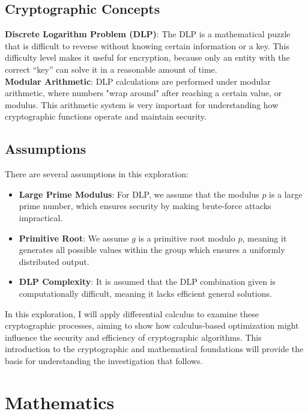\documentclass[12pt]{article}
\begin{document}
\subsection{Cryptographic Concepts}

\textbf{Discrete Logarithm Problem (DLP)}: The DLP is a mathematical puzzle that is difficult to reverse without knowing certain information or a key. This difficulty level makes it useful for encryption, because only an entity with the correct “key” can solve it in a reasonable amount of time.
\\
\textbf{Modular Arithmetic}: DLP calculations are performed under modular arithmetic, where numbers "wrap around" after reaching a certain value, or modulus. This arithmetic system is very important for understanding how cryptographic functions operate and maintain security.

\subsection{Assumptions}

There are several assumptions in this exploration:
\begin{itemize}
    \item \textbf{Large Prime Modulus}: For DLP, we assume that the modulus \( p \) is a large prime number, which ensures security by making brute-force attacks impractical.
    \item \textbf{Primitive Root}: We assume \( g \) is a primitive root modulo \( p \), meaning it generates all possible values within the group which ensures a uniformly distributed output.
    \item \textbf{DLP Complexity}: It is assumed that the DLP combination given is computationally difficult, meaning it lacks efficient general solutions.
\end{itemize}

In this exploration, I will apply differential calculus to examine these cryptographic processes, aiming to show how calculus-based optimization might influence the security and efficiency of cryptographic algorithms. This introduction to the cryptographic and mathematical foundations will provide the basis for understanding the investigation that follows.



\section{Mathematics}
\end{document}

